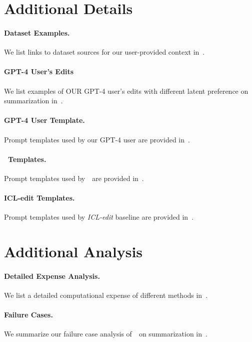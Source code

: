 \section{Additional Details}
\label{app:addition_details}

\paragraph{Dataset Examples.} We list links to dataset sources for our user-provided context in~.

\paragraph{GPT-4 User's Edits} We list examples of OUR GPT-4 user's edits with different latent preference on summarization in~.

\paragraph{GPT-4 User Template.} Prompt templates used by our GPT-4 user are provided in~.

\paragraph{\algname~Templates.} Prompt templates used by~\algname~are provided in~.

\paragraph{ICL-edit Templates.} Prompt templates used by \textit{ICL-edit} baseline are provided in~.

\section{Additional Analysis}
\label{app:additional_analysis}

\paragraph{Detailed Expense Analysis.} We list a detailed computational expense of different methods in~.

\paragraph{Failure Cases.} We summarize our failure case analysis of~\algname~on summarization in~.

